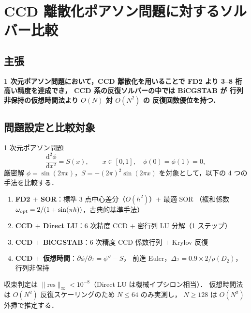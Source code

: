 %

\section{CCD 離散化ポアソン問題に対するソルバー比較}
\label{app:ccd_solver_benchmark}

\subsection{主張}

\begin{center}
\textbf{%
  1 次元ポアソン問題において，CCD 離散化を用いることで%
  FD2 より 3--8 桁高い精度を達成でき，%
  CCD 系の反復ソルバーの中では BiCGSTAB が%
  行列非保持の仮想時間法より $O(N)$ 対 $O(N^2)$ の%
  反復回数優位を持つ．}
\end{center}

\subsection{問題設定と比較対象}

1 次元ポアソン問題
\begin{equation}
  \frac{\mathrm{d}^2\phi}{\mathrm{d}x^2} = S(x),
  \qquad x \in [0,1],\quad \phi(0)=\phi(1)=0,
  \label{eq:bench_poisson}
\end{equation}
厳密解 $\phi = \sin(2\pi x)$，$S = -(2\pi)^2\sin(2\pi x)$
を対象として，以下の 4 つの手法を比較する．

\begin{enumerate}
  \item \textbf{FD2 $+$ SOR}：標準 3 点中心差分（$O(h^2)$）$+$ 最適 SOR
        （緩和係数 $\omega_{\rm opt} = 2/(1+\sin(\pi h))$，古典的基準手法）
  \item \textbf{CCD $+$ Direct LU}：6 次精度 CCD $+$ 密行列 LU 分解（1 ステップ）
  \item \textbf{CCD $+$ BiCGSTAB}：6 次精度 CCD 係数行列 $+$ Krylov 反復
  \item \textbf{CCD $+$ 仮想時間}：$\partial\phi/\partial\tau = \phi'' - S$，
        前進 Euler，$\Delta\tau = 0.9 \times 2/\rho(D_2)$，行列非保持
\end{enumerate}

収束判定は $\|\mathrm{res}\|_\infty < 10^{-8}$（Direct LU は機械イプシロン相当）．
仮想時間法は $O(N^2)$ 反復スケーリングのため $N \leq 64$ のみ実測し，
$N \geq 128$ は $O(N^2)$ 外挿で推定する．

